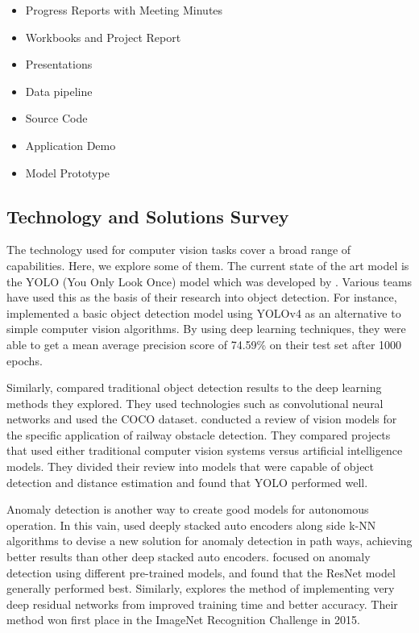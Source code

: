 \documentclass[stu,12pt,floatsintext]{apa7}
\begin{document}
\begin{itemize}
	\item Progress Reports with Meeting Minutes
	\item Workbooks and Project Report
	\item Presentations
	\item Data pipeline
	\item Source Code
	\item Application Demo
	\item Model Prototype
\end{itemize}


\subsection{Technology and Solutions Survey}
The technology used for computer vision tasks cover a broad range of capabilities. Here, we explore some of them. The current state of the art model is the YOLO (You Only Look Once) model which was developed by \textcite{redmon_you_2016}. Various teams have used this as the basis of their research into object detection. For instance, \textcite{sarda_object_2021} implemented a basic object detection model using YOLOv4 as an alternative to simple computer vision algorithms. By using deep learning techniques, they were able to get a mean average precision score of 74.59\% on their test set after 1000 epochs.

Similarly, \textcite{gao_obstacle_2024} compared traditional object detection results to the deep learning methods they explored. They used technologies such as convolutional neural networks and used the COCO dataset. \textcite{ristic-durrant_review_2021} conducted a review of vision models for the specific application of railway obstacle detection. They compared projects that used either traditional computer vision systems versus artificial intelligence models. They divided their review into models that were capable of object detection and distance estimation and found that YOLO performed well.

Anomaly detection is another way to create good models for autonomous operation. In this vain, \textcite{dairi_obstacle_2018} used deeply stacked auto encoders along side k-NN algorithms to devise a new solution for anomaly detection in path ways, achieving better results than other deep stacked auto encoders. \textcite{wenning_anomaly_2022} focused on anomaly detection using different pre-trained models, and found that the ResNet model generally performed best. Similarly, \textcite{he_deep_2016} explores the method of implementing very deep residual networks from improved training time and better accuracy. Their method won first place in the ImageNet Recognition Challenge in 2015.
\end{document}
